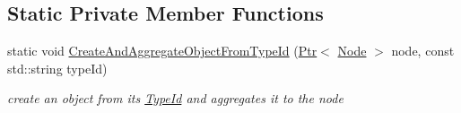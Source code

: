 \subsection*{Static Private Member Functions}
\begin{DoxyCompactItemize}
\item 
static void \hyperlink{classns3_1_1InternetStackHelper_a6605ba9c1bbfdf9ebe09c5dbcfce2451}{Create\+And\+Aggregate\+Object\+From\+Type\+Id} (\hyperlink{classns3_1_1Ptr}{Ptr}$<$ \hyperlink{classns3_1_1Node}{Node} $>$ node, const std\+::string type\+Id)
\begin{DoxyCompactList}\small\item\em create an object from its \hyperlink{classns3_1_1TypeId}{Type\+Id} and aggregates it to the node \end{DoxyCompactList}\end{DoxyCompactItemize}
